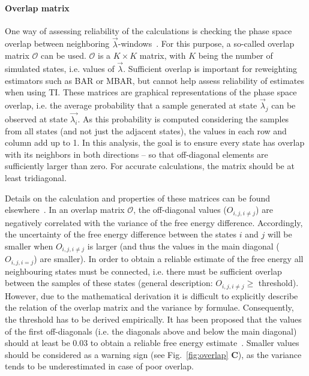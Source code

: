 \documentclass[9pt,bestpractices]{livecoms}
\begin{document}
\paragraph{Overlap matrix}
One way of assessing reliability of the calculations is checking the phase space overlap between neighboring $\vec{\lambda}$-windows~\cite{wu2005phasespaceb, wu2005phasespacec}. For this purpose, a so-called overlap matrix $\mathcal{O}$ can be used. $\mathcal{O}$ is a $K\times K$ matrix, with $K$ being the number of simulated states, i.e. values of $\vec{\lambda}$. Sufficient overlap is important for reweighting estimators such as BAR or MBAR, but cannot help assess reliability of estimates when using TI. 
These matrices are graphical representations of the phase space overlap, i.e. the average probability that a sample generated at state $\vec{\lambda}_{j}$ can be observed at state $\vec{\lambda_{i}}$. As this probability is computed considering the samples from all states (and not just the adjacent states), the values in each row and column add up to 1. In this analysis, the goal is to ensure every state has overlap with its neighbors in both directions -- so that off-diagonal elements are sufficiently larger than zero. For accurate calculations, the matrix should be at least tridiagonal.

Details on the calculation and properties of these matrices can be found elsewhere~\cite{klimovich2015guidelines}.
In an overlap matrix $\mathcal{O}$, the off-diagonal values (${O}_{i,j,i\ne j}$) are negatively correlated with the variance of the free energy difference. Accordingly, the uncertainty of the free energy difference between the states $i$ and $j$ will be smaller when ${O}_{i,j,i\ne j}$ is larger (and thus the values in the main diagonal (${O}_{i,j,i=j}$) are smaller). In order to obtain a reliable estimate of the free energy all neighbouring states must be connected, i.e. there must be sufficient overlap between the samples of these states (general description: ${O}_{i,j,i\ne j}\ge$ threshold).
However, due to the mathematical derivation it is difficult to explicitly describe the relation of the overlap matrix and the variance by formulae. Consequently, the threshold has to be derived empirically. It has been proposed that the values of the first off-diagonals (i.e. the diagonals above and below the main diagonal) should at least be 0.03 to obtain a reliable free energy estimate~\cite{klimovich2015guidelines}. Smaller values should be considered as a warning sign (see Fig.~\ref{fig:overlap} \textbf{C}), as the variance tends to be underestimated in case of poor overlap.
\end{document}
